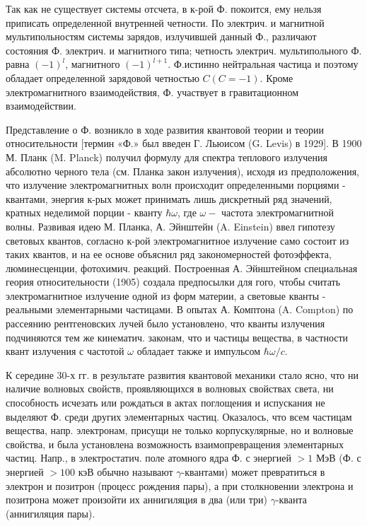 \documentclass[10pt]{article}
\begin{document}
Так как не существует системы отсчета, в к-рой $Ф$. покоится, ему нельзя приписать определенной внутренней четности. По электрич. и магнитной мультипольностям системы зарядов, излучившей данный Ф., различают состояния $Ф$. электрич. и магнитного типа; четность электрич. мультипольного $Ф$. равна $(-1)^{l}$, магнитного $(-1)^{l+1}$. Ф.истинно нейтральная частица и поэтому обладает определенной зарядовой четностью $C(C=-1)$. Кроме электромагнитного взаимодействия, Ф. участвует в гравитационном взаимодействии.



Представление о Ф. возникло в ходе развития квантовой теории и теории относительности [термин «Ф.» был введен Г. Льюисом (G. Levis) в 1929]. В 1900 М. Планк (M. Planck) получил формулу для спектра теплового излучения абсолютно черного тела (см. Планка закон излучения), исходя из предположения, что излучение электромагнитных волн происходит определенными порциями - квантами, энергия к-рых может принимать лишь дискретный ряд значений, кратных неделимой порции - кванту $\hbar \omega$, где $\omega-$ частота электромагнитной волны. Развивая идею М. Планка, А. Эйнштейн (A. Einstein) ввел гипотезу световых квантов, согласно к-рой электромагнитное излучение само состоит из таких квантов, и на ее основе объяснил ряд закономерностей фотоэффекта, люминесценции, фотохимич. реакций. Построенная А. Эйнштейном специальная геория относительности (1905) создала предпосылки для гого, чтобы считать электромагнитное излучение одной из форм материи, а световые кванты - реальными элементарными частицами. В опытах А. Комптона (A. Compton) по рассеянию рентгеновских лучей было установлено, что кванты излучения подчиняются тем же кинематич. законам, что и частицы вещества, в частности квант излучения с частотой $\omega$ обладает также и импульсом $\hbar \omega / c$.



К середине 30-х гг. в результате развития квантовой механики стало ясно, что ни наличие волновых свойств, проявляющихся в волновых свойствах света, ни способность исчезать или рождаться в актах поглощения и испускания не выделяют Ф. среди других элементарных частиц. Оказалось, что всем частицам вещества, напр. электронам, присущи не только корпускулярные, но и волновые свойства, и была установлена возможность взаимопревращения элементарных частиц. Напр., в электростатич. поле атомного ядра Ф. с энергией $>1$ МэВ (Ф. с энергией $>100$ кэВ обычно называют $\gamma$-квантами) может превратиться в электрон и позитрон (процесс рождения пары), а при столкновении электрона и позитрона может произойти их аннигиляция в два (или три) $\gamma$-кванта (аннигиляция пары).
\end{document}
